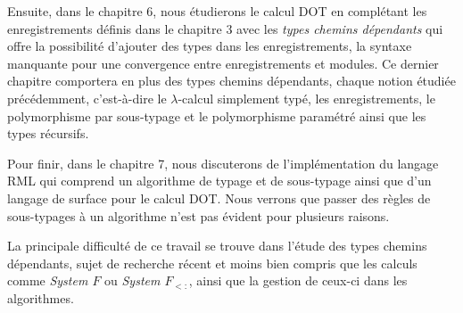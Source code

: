 Ensuite, dans le chapitre 6, nous étudierons le calcul DOT en complétant les
enregistrements définis dans le chapitre 3 avec les \textit{types chemins
dépendants} qui offre la possibilité d'ajouter des types dans les
enregistrements, la syntaxe manquante pour une
convergence entre enregistrements et modules. Ce dernier chapitre comportera en
plus des types chemins dépendants, chaque notion étudiée précédemment,
c'est-à-dire le $\lambda$-calcul simplement typé, les
enregistrements, le polymorphisme par sous-typage et le polymorphisme paramétré
ainsi que les types récursifs.

Pour finir, dans le chapitre 7, nous discuterons de l'implémentation du langage
RML\cite{rml-github} qui comprend un algorithme de typage et de sous-typage
ainsi que d'un langage de surface pour le
calcul DOT. Nous verrons que passer des règles de sous-typages à un algorithme
n'est pas évident pour plusieurs raisons.


La principale difficulté de ce travail se trouve dans l'étude des types
chemins dépendants, sujet de recherche récent et moins bien compris que les
calculs comme \textit{System $F$} ou \textit{System $F_{<:}$}, ainsi que
la gestion de ceux-ci dans les algorithmes.
